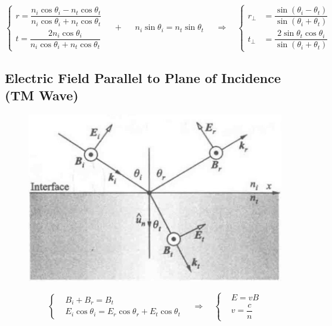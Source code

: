 \begin{equation*}
  \left\{
  \begin{aligned}
    r = \dfrac{n_i \cos \theta_i - n_t \cos \theta_t}{n_i \cos \theta_i + n_t \cos \theta_t} \\
    t = \dfrac{2 n_i \cos \theta_i}{n_i \cos \theta_i + n_t \cos \theta_t} 
  \end{aligned}
  \right.
  \quad + \quad
  \begin{aligned}
    n_i \sin \theta_i = n_t \sin \theta_t
  \end{aligned}
  \quad \Rightarrow \quad
  \left\{
  \begin{aligned}
    r_{\perp} &= \dfrac{\sin \left( \theta_i - \theta_t \right)}{\sin \left( \theta_i + \theta_t \right)} \\
    t_{\perp} &= \dfrac{2 \sin \theta_t \cos \theta_i}{\sin \left( \theta_i + \theta_t \right)} 
  \end{aligned}
  \right.
\end{equation*}

\subsection{Electric Field Parallel to Plane of Incidence (TM Wave)}

\begin{figure}[H]
  \centering
  \includegraphics[width=0.4\linewidth]{figures/Fresnel-parallel}
\end{figure}

\begin{equation*}
 \left\{
  \begin{aligned}
    & B_i + B_r = B_t \\
    & E_i \cos \theta_i = E_r \cos \theta_r + E_t \cos \theta_t
  \end{aligned}
  \right.
  \quad \Rightarrow \quad
  \left\{
  \begin{aligned}
    & E = v B \\
    & v = \dfrac{c}{n}
  \end{aligned}
  \right.
\end{equation*}

